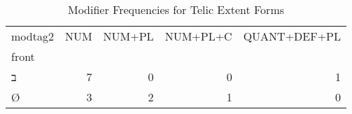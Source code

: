 \begin{table}[htbp!]
\centering
\caption{Modifier Frequencies for Telic Extent Forms}
\label{table:telext_mod_ct}
\begin{tabular}{lrrrr}
\toprule
modtag2 &  NUM &  NUM+PL &  NUM+PL+C &  QUANT+DEF+PL \\
front &      &         &           &               \\
\midrule
ב     &    7 &       0 &         0 &             1 \\
Ø     &    3 &       2 &         1 &             0 \\
\bottomrule
\end{tabular}
\end{table}
